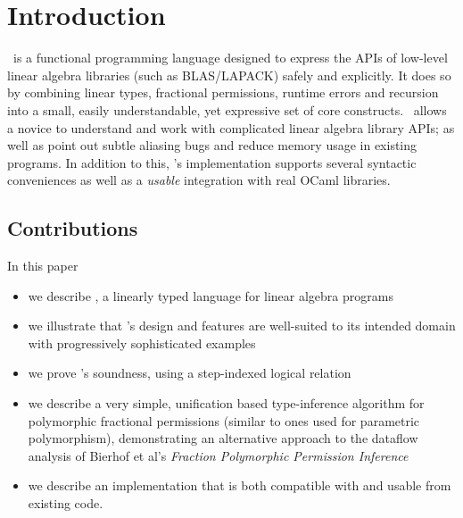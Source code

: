 \section{Introduction}

\lang\ is a functional programming language designed to express the APIs of
low-level linear algebra libraries (such as BLAS/LAPACK) safely and explicitly.
It does so by combining linear types, fractional permissions, runtime errors
and recursion into a small, easily understandable, yet expressive set of core
constructs. \lang\ allows a novice to understand and work with complicated
linear algebra library APIs; as well as point out subtle aliasing bugs and
reduce memory usage in existing programs. In addition to this, \lang's
implementation supports several syntactic conveniences as well as a
\emph{usable} integration with real OCaml libraries.

\subsection{Contributions}

In this paper
\begin{itemize}
    \item we describe \lang, a linearly typed language for linear algebra programs
    \item we illustrate that \lang's design and features are well-suited to its
        intended domain with progressively sophisticated examples
    \item we prove \lang's soundness, using a step-indexed logical relation
    \item we describe a very simple, unification based type-inference algorithm
        for polymorphic fractional permissions (similar to ones used for
        parametric polymorphism), demonstrating an alternative approach to the
        dataflow analysis of Bierhof et al's \emph{Fraction Polymorphic
        Permission Inference}
    \item we describe an implementation that is both compatible with and usable
        from existing code.
\end{itemize}

